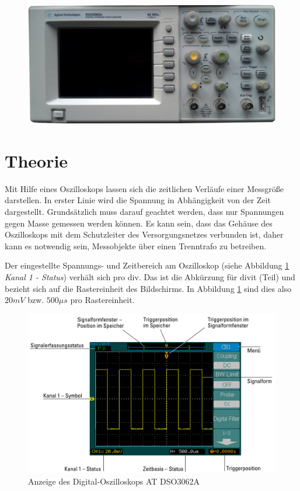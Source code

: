 \begin{figure}
	\vspace{-4cm}
  	\includegraphics[scale=0.08]{Oszi/Bilder/oszi_foto.png}
 	\vspace{-4cm}
	\end{figure}

\section*{Theorie}

Mit Hilfe eines Oszilloskops lassen sich die zeitlichen Verläufe einer Messgröße darstellen. In erster Linie wird die Spannung in Abhängigkeit von der Zeit dargestellt.
Grundsätzlich muss darauf geachtet werden, dass nur Spannungen gegen Masse gemessen werden können.
Es kann sein, dass das Gehäuse des Oszilloskops mit dem Schutzleiter des Versorgungsnetzes verbunden ist, daher kann es notwendig sein, Messobjekte über einen Trenntrafo zu betreiben.\par

Der eingestellte Spannungs- und Zeitbereich am Oszilloskop (siehe Abbildung \ref{Anzeige_Oszi} \textit{Kanal 1 - Status}) verhält sich pro div.
Das ist die  Abkürzung für divit (Teil) und bezieht sich auf die Rastereinheit des Bildschirms. In Abbildung \ref{Anzeige_Oszi} sind dies also $20mV$ bzw. $500\mu s$ pro Rastereinheit.\par

\begin{figure}[H]
\centering
\includegraphics[scale=0.25]{Oszi/Bilder/oszi_anzeige.png}
\caption{Anzeige des Digital-Oszilloskops AT DSO3062A}
\label{Anzeige_Oszi}
\end{figure}
 
